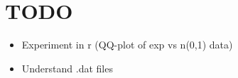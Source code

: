 \section{TODO}\par
\begin{itemize}
  \item Experiment in r (QQ-plot of exp vs n(0,1) data)
  \item Understand .dat files
\end{itemize}
